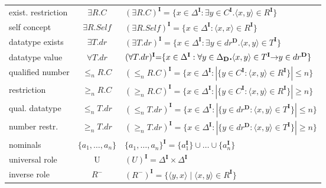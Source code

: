\documentclass[a4paper]{llncs}
\newcommand{\I}{\mathbf{I}}
\newcommand{\D}{\mathbf{D}}
\begin{document}
{\begin{longtable}{|>{\centering}m{2.5cm}|c|>{\centering\arraybackslash}m{7.5cm}|}
exist. restriction & $\exists R.C$ & $(\exists R.C)^\I = \{x \in \Delta^\I : \exists y \in C^\I \textbf{.} \langle x,y \rangle \in R^\I\}$  \\

self concept & $\exists R.\mathit{Self}$ & $(\exists R.\mathit{Self})^\I = \{ x \in \Delta^\I : \langle x,x \rangle \in R^\I  \}$ \\

datatype exists & $\exists T.dr$ & $(\exists T.dr)^\I = \{x \in \Delta^\I : \exists y \in dr^\D \textbf{.} \langle x,y \rangle \in T^\I\}$\\

datatype value & $\forall T.dr$ & $(\forall T.dr)^\I\hspace*{-0.1cm} = \hspace*{-0.1cm}\{x \in \Delta^\I : \forall y \in \Delta_\D \textbf{.} \langle x,y \rangle \in T^\I\hspace*{-0.1cm} \rightarrow\hspace*{-0.1cm} y \in dr^\D \}$\\

qualified number  &  $\leq_n\!\! R.C$ & $(\leq_n\!\! R.C)^\I = \{ x \in \Delta^\I : |\{ y \in C^\I : \langle x,y \rangle \in R^\I \}| \leq n  \}$\\

restriction& $\geq_n\!\! R.C$ & $(\geq_n\!\! R.C)^\I =\{ x \in \Delta^\I : |\{ y \in C^\I: \langle x,y \rangle \in R^\I  \}| \geq n  \}$ \\

qual. datatype   &  $\leq_n\!\! T.dr$ & $(\leq_n\!\! T.dr)^\I = \{ x \in \Delta^\I : |\{ y \in dr^\D : \langle x,y \rangle \in T^\I \}| \leq n  \}$\\

number restr.& $\geq_n\!\! T.dr$ & $(\geq_n\!\! T.dr)^\I =\{ x \in \Delta^\I : |\{ y \in dr^\D: \langle x,y \rangle \in T^\I  \}| \geq n  \}$ \\

nominals & $\{ a_1, \ldots , a_n \}$& $\{ a_1, \ldots , a_n \}^\I = \{a_1^\I \} \cup \ldots \cup \{a_n^\I \} $ \\

\hline

universal role & U & $(U)^\I = \Delta^\I \times \Delta^\I$\\

inverse role & $R^-$ & $(R^-)^\I = \{\langle y,x \rangle  \mid \langle x,y \rangle \in R^\I\}$\\


\end{longtable}}
\end{document}
